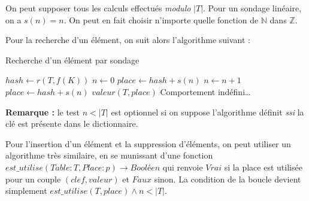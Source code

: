 \documentclass[../../../main.tex]{subfiles}
\begin{document}
\begin{minipage}{\textwidth}
	\begin{center}
		
	\end{center}
\end{minipage}

On peut supposer tous les calculs effectués \textit{modulo} $|T|$. Pour un sondage linéaire, on a $s(n) = n$. On peut en fait choisir n'importe quelle fonction de $\mathbb{N}$ dans $\mathbb{Z}$.

Pour la recherche d'un élément, on suit alors l'algorithme suivant :\newline

\begin{algorithm}
\caption{Recherche d'un élément par sondage}\label{alg:dict_sondage}
$hash \leftarrow r(T, f(K))$\;
$n \leftarrow 0$\;
$place \leftarrow hash + s(n)$\;
 {
	$n\leftarrow n + 1$\;
	$place\leftarrow hash + s(n)$\;
}
 {
	\Return $valeur(T, place)$\;
} {
	Comportement indéfini\dots {}
}
\end{algorithm}

\textbf{Remarque :} le test $n < |T|$ est optionnel si on suppose l'algorithme définit \textit{ssi} la clé est présente dans le dictionnaire.

Pour l'insertion d'un élément et la suppression d'éléments, on peut utiliser un algorithme très similaire, en se munissant d'une fonction $est\_utilise(Table:T, Place:p)\rightarrow \textit{Booléen}$ qui renvoie $Vrai$ si la place est utilisée pour un couple $(clef, valeur)$ et $Faux$ sinon. La condition de la boucle devient simplement $est\_utilise(T, place) \wedge n < |T|$.
\end{document}
